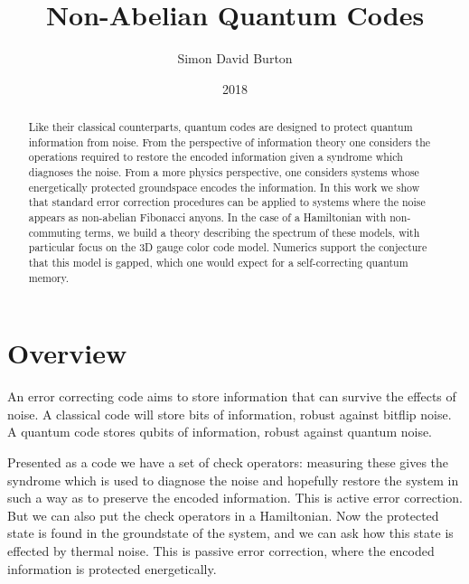 \documentclass[11pt,oneside]{report}
\title{Non-Abelian Quantum Codes}
\author{Simon David Burton}
\date{2018}
\newcommand{\danbrowne}[1]{\ \textcolor{red}{\{#1\}}\ }
\begin{document}

\maketitle


\begin{abstract}
Like their classical counterparts,
quantum codes are designed to protect quantum
information from noise.
From the perspective of information theory
one considers the operations required to restore
the encoded information given a syndrome which
diagnoses the noise.
From a more physics perspective, one considers
systems whose energetically protected groundspace
encodes the information.
In this work we show that standard error correction
procedures can be applied to systems where the
noise appears as non-abelian Fibonacci anyons.
In the case of a Hamiltonian with non-commuting
terms, we build a theory describing the spectrum of
these models,  
with particular focus on the 3D gauge color code model.
Numerics support the conjecture that this model is gapped,
which one would expect for a self-correcting quantum memory.
\end{abstract}

\attribution

\dedication{To Arina}

\tableofcontents
\newpage
{}

\setcounter{chapter}{-1}
\chapter{Overview}


An error correcting code aims to store information
that can survive the effects of noise.
A classical code will store bits of information,
robust against bitflip noise.
A quantum code stores qubits of information,
robust against quantum noise.

Presented as a code we have a set of check operators:
measuring these gives the syndrome which is used to 
diagnose the noise and hopefully restore the system
in such a way as to preserve the encoded information.
This is active error correction.
But we can also put the check operators in a Hamiltonian.
Now the protected state is found in the groundstate of
the system, and we can ask how this state is effected
by thermal noise.
This is passive error correction, where the
encoded information is protected energetically.
\end{document}
